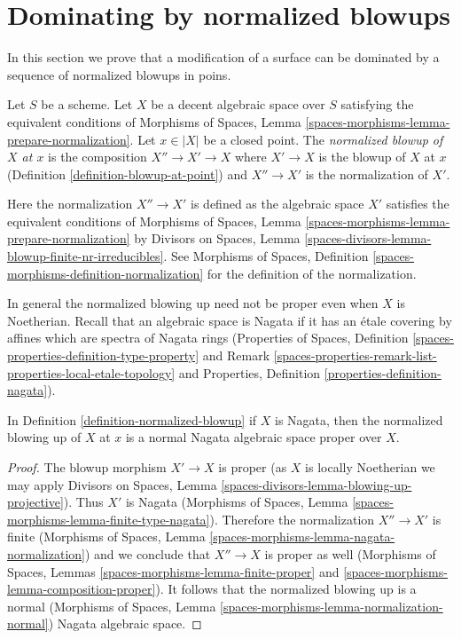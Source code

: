 \section{Dominating by normalized blowups}
\label{section-normalized-blowups}

\noindent
In this section we prove that a modification of a surface can be dominated
by a sequence of normalized blowups in poins.

\begin{definition}
\label{definition-normalized-blowup}
Let $S$ be a scheme. Let $X$ be a decent algebraic space over $S$ satisfying
the equivalent conditions of
Morphisms of Spaces, Lemma \ref{spaces-morphisms-lemma-prepare-normalization}.
Let $x \in |X|$ be a closed point. The {\it normalized blowup of $X$ at $x$}
is the composition $X'' \to X' \to X$ where $X' \to X$ is the blowup
of $X$ at $x$ (Definition \ref{definition-blowup-at-point})
and $X'' \to X'$ is the normalization of $X'$.
\end{definition}

\noindent
Here the normalization $X'' \to X'$ is defined as the algebraic space
$X'$ satisfies the equivalent conditions of
Morphisms of Spaces, Lemma \ref{spaces-morphisms-lemma-prepare-normalization}
by
Divisors on Spaces, Lemma
\ref{spaces-divisors-lemma-blowup-finite-nr-irreducibles}.
See Morphisms of Spaces, Definition
\ref{spaces-morphisms-definition-normalization}
for the definition of the normalization.

\medskip\noindent
In general the normalized blowing up need not be proper even
when $X$ is Noetherian. Recall that an algebraic space is Nagata if it
has an \'etale covering by affines which are spectra of Nagata rings
(Properties of Spaces, Definition
\ref{spaces-properties-definition-type-property} and
Remark \ref{spaces-properties-remark-list-properties-local-etale-topology} and
Properties, Definition \ref{properties-definition-nagata}).

\begin{lemma}
\label{lemma-Nagata-normalized-blowup}
In Definition \ref{definition-normalized-blowup} if $X$ is Nagata,
then the normalized blowing up of $X$ at $x$ is a
normal Nagata algebraic space proper over $X$.
\end{lemma}

\begin{proof}
The blowup morphism $X' \to X$ is proper
(as $X$ is locally Noetherian we may apply
Divisors on Spaces, Lemma \ref{spaces-divisors-lemma-blowing-up-projective}).
Thus $X'$ is Nagata
(Morphisms of Spaces, Lemma \ref{spaces-morphisms-lemma-finite-type-nagata}).
Therefore the normalization $X'' \to X'$ is finite
(Morphisms of Spaces, Lemma \ref{spaces-morphisms-lemma-nagata-normalization})
and we conclude that $X'' \to X$ is proper as well
(Morphisms of Spaces, Lemmas \ref{spaces-morphisms-lemma-finite-proper} and
\ref{spaces-morphisms-lemma-composition-proper}).
It follows that the normalized blowing up
is a normal (Morphisms of Spaces, Lemma
\ref{spaces-morphisms-lemma-normalization-normal})
Nagata algebraic space.
\end{proof}

